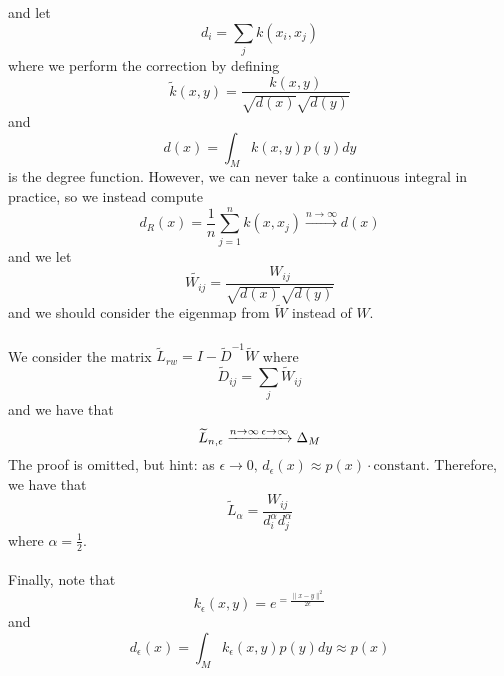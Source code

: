 \documentclass[12pt]{article}
\theoremstyle{plain}
\begin{document}
and let
\[
d_i = \sum_{j} k(x_i, x_j)
\]
where we perform the correction by defining
\[
\widetilde{k} (x, y) = \frac{k(x, y)}{\sqrt{d(x)} \sqrt{d(y)}}
\]
and
\[
d(x) = \int_M k(x, y) p(y) dy
\]
is the degree function. However, we can never take a continuous integral in practice, so we instead compute
\[
d_R (x) = \frac{1}{n} \sum_{j = 1}^n k(x, x_j) \xrightarrow{n \to \infty} d(x)
\]
and we let
\[
\widetilde{W_{ij}} = \frac{W_{ij}}{\sqrt{d(x)} \sqrt{d(y)}}
\]
and we should consider the eigenmap from $ \widetilde{W} $ instead of $ W $.
\\ \\
We consider the matrix $ \widetilde{L}_{rw} = I - \widetilde{D}^{-1} \widetilde{W} $ where
\[
\widetilde{D}_{ij} = \sum_j \widetilde{W}_{ij}
\]
and we have that
\[
\widetilde{L}_{n, \epsilon} \xrightarrow{n \to \infty \\ \epsilon \to \infty} \Delta_M
\]
The proof is omitted, but hint: as $ \epsilon \to 0, \, d_{\epsilon} (x) \approx p(x) \cdot \text{constant} $.
Therefore, we have that
\[
\widetilde{L}_{\alpha} = \frac{W_{ij}}{d_i^{\alpha} d_j^{\alpha}}
\]
where $ \alpha = \frac{1}{2} $.
\\ \\
Finally, note that
\[
k_{\epsilon} (x, y) = e^{= \frac{\| x - y \|^2}{2 \epsilon}}
\]
and
\[
d_{\epsilon} (x) = \int_M k_{\epsilon} (x, y) p(y) dy \approx p(x)
\]
\end{document}
